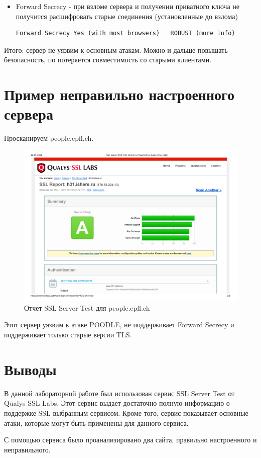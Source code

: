 \begin{itemize}
	\item Forward Secrecy - при взломе сервера и получении приватного ключа не получится расшифровать старые соединения (установленные до взлома)
	\begin{lstlisting}
Forward Secrecy	Yes (with most browsers)   ROBUST (more info)
	\end{lstlisting}
\end{itemize}

Итого: сервер не уязвим к основным атакам. Можно и дальше повышать безопасность, по потеряется совместимость со старыми клиентами.

\section{Пример неправильно настроенного сервера}

Просканируем people.epfl.ch.

\begin{figure}[H]
	\centering
	\includegraphics[width=\textwidth]{test1.pdf}
	\caption{Отчет SSL Server Test для people.epfl.ch}
\end{figure}

Этот сервер уязвим к атаке POODLE, не поддерживает Forward Secrecy и поддерживает только старые версии TLS.

\section{Выводы}
В данной лабораторной работе был использован сервис SSL Server Test от Qualys SSL Labs. Этот сервис выдает достаточно полную информацию о поддержке SSL выбранным сервисом. Кроме того, сервис показывает основные атаки, которые могут быть применены для данного сервиса.

С помощью сервиса было проанализировано два сайта, правильно настроенного и неправильного.